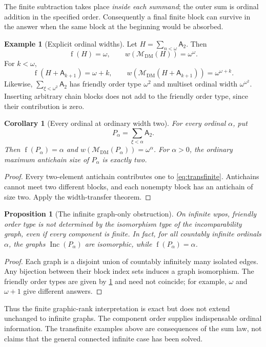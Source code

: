\documentclass[11pt,letterpaper]{article}
\newtheorem{proposition}[proposition]{Proposition}
\newtheorem{corollary}[corollary]{Corollary}
\theoremstyle{definition}
\newtheorem{example}[example]{Example}
\theoremstyle{remark}
\newcommand{\fot}{\operatorname{f}}
\newcommand{\Inc}{\operatorname{Inc}}
\newcommand{\DM}{\mathrm{DM}}
\newcommand{\M}{\mathcal M}
\newcommand{\A}{\mathsf A}
\begin{document}
The finite subtraction takes place \emph{inside each summand}; the outer sum
is ordinal addition in the specified order. Consequently a final finite
block can survive in the answer when the same block at the beginning would
be absorbed.

\begin{example}[Explicit ordinal widths]
Let $H=\sum_{n<\omega}\A_2$. Then
\[
 \fot(H)=\omega,\qquad w(\M_{\DM}(H))=\omega^\omega.
\]
For $k<\omega$,
\[
 \fot(H+\A_{k+1})=\omega+k,
 \qquad w(\M_{\DM}(H+\A_{k+1}))=\omega^{\omega+k}.
\]
Likewise, $\sum_{\xi<\omega^2}\A_2$ has friendly order type $\omega^2$
and multiset ordinal width $\omega^{\omega^2}$. Inserting arbitrary chain
blocks does not add to the friendly order type, since their contribution is zero.
\end{example}

\begin{corollary}[Every ordinal at ordinary width two]\label{cor:all-ordinals}
For every ordinal $\alpha$, put
\[
 P_\alpha=\sum_{\xi<\alpha}\A_2.
\]
Then $\fot(P_\alpha)=\alpha$ and
$w(\M_{\DM}(P_\alpha))=\omega^\alpha$. For $\alpha>0$, the ordinary
maximum antichain size of $P_\alpha$ is exactly two.
\end{corollary}
\begin{proof}
Every two-element antichain contributes one to \eqref{eq:transfinite}.
Antichains cannot meet two different blocks, and each nonempty block has
an antichain of size two. Apply the width-transfer theorem.
\end{proof}

\begin{proposition}[The infinite graph-only obstruction]\label{prop:graph-obstruction}
On infinite wpos, friendly order type is not determined by the isomorphism
type of the incomparability graph, even if every component is finite.
In fact, for all countably infinite ordinals $\alpha$, the graphs
$\Inc(P_\alpha)$ are isomorphic, while $\fot(P_\alpha)=\alpha$.
\end{proposition}
\begin{proof}
Each graph is a disjoint union of countably infinitely many isolated edges.
Any bijection between their block index sets induces a graph isomorphism.
The friendly order types are given by \cref{cor:all-ordinals} and need not
coincide; for example, $\omega$ and $\omega+1$ give different answers.
\end{proof}

Thus the finite graphic-rank interpretation is exact but does not extend
unchanged to infinite graphs. The component order supplies indispensable
ordinal information. The transfinite examples above are consequences of
the sum law, not claims that the general connected infinite case has been solved.
\end{document}
